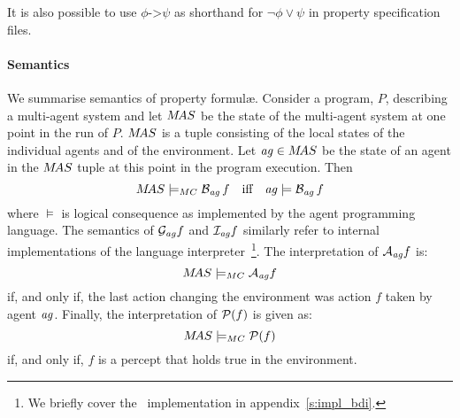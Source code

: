 \documentclass[a4]{article}
\begin{document}
It is also possible to use $\phi \texttt{->} \psi$ as shorthand for $\neg \phi \vee \psi$ in property specification files.

\medskip

\paragraph{Semantics}
We summarise semantics of property formul\ae{}.
Consider a program, $P$, describing a multi-agent system and let
$M\!AS$ be the state of the multi-agent system at one point in the run
of $P$.  $M\!AS$ is a tuple consisting of the local states of the individual agents and of the environment. Let $\mathit{ag} \in M\!AS$ be the state of an agent in the $M\!AS$ tuple at this point in the 
program execution. Then 
$$
M\!AS \models_{MC} \mathrm{{\cal B}}_{\mathit{ag}} \, f \text{\quad iff\quad }
\mathit{ag} \models  \mathrm{{\cal B}}_{\mathit{ag}} \, f
$$
where $\models$ is logical consequence as implemented by the agent
programming language. The semantics of $\mathrm{{\cal G}}_{\mathit{ag}} f$ and $\mathrm{{\cal I}}_{\mathit{ag}} f$ similarly refer to internal implementations of the language interpreter~\footnote{We briefly cover the \gwendolen\ implementation in appendix~\ref{s:impl_bdi}.}.  
The interpretation of $\mathrm{{\cal A}}_{\mathit{ag}} f$ is:
$$M\!AS \models_{MC}
\mathrm{{\cal A}}_{\mathit{ag}} f$$ if, and only if, the last action changing
the environment was action $f$ taken by agent $\mathit{ag}$.  Finally, the interpretation of
$\mathrm{{\cal P}}(f)$ is given as:
$$M\!AS
\models_{MC} \mathrm{{\cal P}}(f)$$ if, and only if, $f$ is a percept that
holds true in the environment.
\medskip
\end{document}
